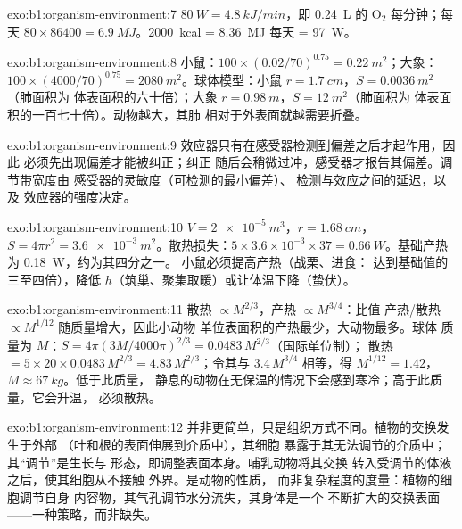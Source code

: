 \begin{solution}{exo:b1:organism-environment:7}
$\qty{80}{W} = \qty{4.8}{kJ/min}$，即 \qty{0.24}{L} 的 $\mathrm{O_2}$
每分钟；每天 $80\times 86400 = \qty{6.9}{MJ}$。\qty{2000}{kcal}
= \qty{8.36}{MJ} 每天 = \qty{97}{W}。
\end{solution}

\begin{solution}{exo:b1:organism-environment:8}
小鼠：$100\times(0.02/70)^{0.75} = \qty{0.22}{m^2}$；大象：
$100\times(4000/70)^{0.75} = \qty{2080}{m^2}$。球体模型：小鼠
$r = \qty{1.7}{cm}$，$S = \qty{0.0036}{m^2}$（肺面积为
体表面积的六十倍）；大象 $r = \qty{0.98}{m}$，$S = \qty{12}{m^2}$（肺面积为
体表面积的一百七十倍）。动物越大，其肺
相对于外表面就越需要折叠。
\end{solution}

\begin{solution}{exo:b1:organism-environment:9}
效应器只有在感受器检测到偏差之后才起作用，因此
必须先出现偏差才能被纠正；纠正
随后会稍微过冲，感受器才报告其偏差。调节带宽度由
感受器的灵敏度（可检测的最小偏差）、
检测与效应之间的延迟，以及
效应器的强度决定。
\end{solution}

\begin{solution}{exo:b1:organism-environment:10}
$V = \qty{2e-5}{m^3}$，$r = \qty{1.68}{cm}$，$S = 4\pi r^2 =
\qty{3.6e-3}{m^2}$。散热损失：$5\times 3.6\times 10^{-3}\times 37 =
\qty{0.66}{W}$。基础产热为 \qty{0.18}{W}，约为其四分之一。
小鼠必须提高产热（战栗、进食：
达到基础值的三至四倍），降低 $h$（筑巢、聚集取暖）或让体温下降（蛰伏）。
\end{solution}

\begin{solution}{exo:b1:organism-environment:11}
散热 $\propto M^{2/3}$，产热 $\propto M^{3/4}$：比值
产热/散热 $\propto M^{1/12}$ 随质量增大，因此小动物
单位表面积的产热最少，大动物最多。球体
质量为 $M$：$S = 4\pi(3M/4000\pi)^{2/3} = \num{0.0483}\,M^{2/3}$（国际单位制）；
散热 $= 5\times 20\times 0.0483\,M^{2/3} = 4.83\,M^{2/3}$；令其与
$3.4\,M^{3/4}$ 相等，得 $M^{1/12} = 1.42$，$M \approx \qty{67}{kg}$。低于此质量，
静息的动物在无保温的情况下会感到寒冷；高于此质量，它会升温，
必须散热。
\end{solution}

\begin{solution}{exo:b1:organism-environment:12}
并非更简单，只是组织方式不同。植物的交换发生于外部
（叶和根的表面伸展到介质中），其细胞
暴露于其无法调节的介质中；其“调节”是生长与
形态，即调整表面本身。哺乳动物将其交换
转入受调节的体液之后，使其细胞从不接触
外界。是动物的性质，
而非复杂程度的度量：植物的细胞调节自身
内容物，其气孔调节水分流失，其身体是一个
不断扩大的交换表面——一种策略，而非缺失。
\end{solution}

